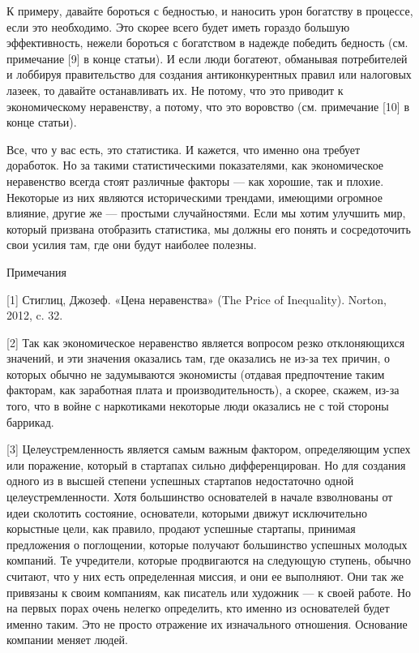 \documentclass[ebook,12pt,oneside,openany]{memoir}
\begin{document}
К примеру, давайте бороться с бедностью, и наносить урон богатству в
процессе, если это необходимо. Это скорее всего будет иметь гораздо
большую эффективность, нежели бороться с богатством в надежде победить
бедность (см. примечание [9] в конце статьи). И если люди богатеют,
обманывая потребителей и лоббируя правительство для создания
антиконкурентных правил или налоговых лазеек, то давайте останавливать
их. Не потому, что это приводит к экономическому неравенству, а
потому, что это воровство (см. примечание [10] в конце статьи).

Все, что у вас есть, это статистика. И кажется, что именно она требует
доработок. Но за такими статистическими показателями, как
экономическое неравенство всегда стоят различные факторы — как
хорошие, так и плохие. Некоторые из них являются историческими
трендами, имеющими огромное влияние, другие же — простыми
случайностями. Если мы хотим улучшить мир, который призвана отобразить
статистика, мы должны его понять и сосредоточить свои усилия там, где
они будут наиболее полезны.

Примечания

[1] Стиглиц, Джозеф. «Цена неравенства» (The Price of Inequality).
Norton, 2012, c. 32.

[2] Так как экономическое неравенство является вопросом резко
отклоняющихся значений, и эти значения оказались там, где оказались не
из-за тех причин, о которых обычно не задумываются экономисты (отдавая
предпочтение таким факторам, как заработная плата и
производительность), а скорее, скажем, из-за того, что в войне с
наркотиками некоторые люди оказались не с той стороны баррикад.

[3] Целеустремленность является самым важным фактором, определяющим
успех или поражение, который в стартапах сильно дифференцирован. Но
для создания одного из в высшей степени успешных стартапов
недостаточно одной целеустремленности. Хотя большинство основателей в
начале взволнованы от идеи сколотить состояние, основатели, которыми
движут исключительно корыстные цели, как правило, продают успешные
стартапы, принимая предложения о поглощении, которые получают
большинство успешных молодых компаний. Те учредители, которые
продвигаются на следующую ступень, обычно считают, что у них есть
определенная миссия, и они ее выполняют. Они так же привязаны к своим
компаниям, как писатель или художник — к своей работе. Но на первых
порах очень нелегко определить, кто именно из основателей будет именно
таким. Это не просто отражение их изначального отношения. Основание
компании меняет людей.
\end{document}
